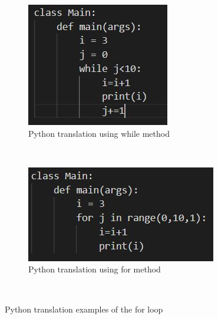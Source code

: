 \documentclass{l4proj}
\begin{document}
\begin{figure}[htb] 
    \centering
    \begin{subfigure}[b]{0.45\textwidth}
        \includegraphics[width=\textwidth]{images/normalForWhile.JPG}
        \caption{Python translation using while method}
        \label{fig:normalForWhile}
    \end{subfigure}
    ~ %
    \begin{subfigure}[b]{0.45\textwidth}
        \includegraphics[width=\textwidth]{images/normalForFor.JPG}
        \caption{Python translation using for method}
        \label{fig:normalForFor}
    \end{subfigure}
    ~ %
    \caption{Python translation examples of the for loop
    }\label{fig:normalForPython}
\end{figure}
\end{document}
